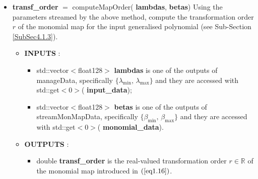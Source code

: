 \documentclass[a4paper, twosided]{book}
\begin{document}
\begin{itemize}
    \item \color{poliDarkBlue} \textbf{transf\_order} \color{black} $=$ \colorbox{poliGrayBlue}{computeMapOrder}(\color{poliDarkBlue} \textbf{lambdas}\color{black}, \color{poliDarkBlue} \textbf{betas}\color{black})
    \newline Using the parameters streamed by the above method, compute the transformation order $r$ of the monomial map for the input generalised polynomial (see Sub-Section \ref{SubSec4.1.3}).
    \begin{itemize}
        \item \color{poliDarkBlue} \textbf{INPUTS} \color{black}:
        \begin{itemize}
            \item \colorbox{poliGrayBlue}{std::vector$<$float128$>$} \color{poliDarkBlue} \textbf{lambdas} \color{black} is one of the outputs of \colorbox{poliGrayBlue}{manageData}, specifically $\{\lambda_{\text{min}},\,\lambda_{\text{max}}\}$ and they are accessed with \colorbox{poliGrayBlue}{std::get$<$0$>$}(\color{poliDarkBlue} \textbf{input\_data}\color{black});
            \item \colorbox{poliGrayBlue}{std::vector$<$float128$>$} \color{poliDarkBlue} \textbf{betas} \color{black} is one of the outputs of \colorbox{poliGrayBlue}{streamMonMapData}, specifically $\{\beta_{\text{min}},\,\beta_{\text{max}}\}$ and they are accessed with \colorbox{poliGrayBlue}{std::get$<$0$>$}(\color{poliDarkBlue} \textbf{monomial\_data}\color{black}).
        \end{itemize}
        \item \color{poliDarkBlue} \textbf{OUTPUTS} \color{black}:
        \begin{itemize}
            \item \colorbox{poliGrayBlue}{double} \color{poliDarkBlue} \textbf{transf\_order} \color{black} is the real-valued transformation order $r\in\mathbb{R}$ of the monomial map introduced in $(\ref{eq1.16})$.
        \end{itemize}
    \end{itemize}
    

\end{itemize}
\end{document}

